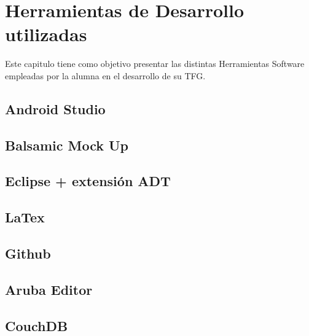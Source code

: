 %
%
%


\chapter{Herramientas de Desarrollo utilizadas} \label{chap:HerramientasSoftware}

Este capitulo tiene como objetivo presentar las distintas Herramientas Software empleadas por la alumna en el desarrollo de su TFG.

\section{Android Studio}


\section{Balsamic Mock Up}


\section{Eclipse + extensión ADT}

\section{LaTex}

\section{Github}

\section{Aruba Editor}

\section{CouchDB}
